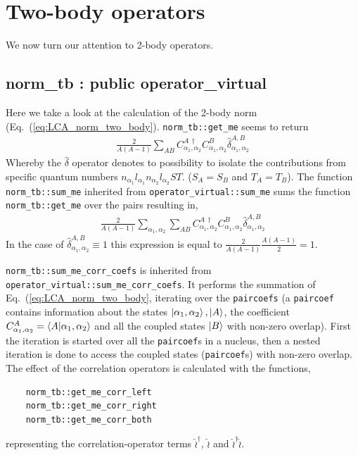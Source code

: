\documentclass[10pt]{article}
\begin{document}
\section{Two-body operators}
We now turn our attention to 2-body operators.
\subsection{norm\_tb : public operator\_virtual}
Here we take a look at the calculation of the 2-body norm (Eq.~(\ref{eq:LCA_norm_two_body}).
\texttt{norm\_tb::get\_me} seems to return 
\begin{align*}
	\frac{2}{A(A-1)}\sum_{AB} C_{\alpha_1,\alpha_2}^{A\,\dagger} C_{\alpha_1,\alpha_2}^{B} \hat{\delta}_{\alpha_1,\alpha_2}^{A,B}
\end{align*}
Whereby the $\hat{\delta}$ operator denotes to possibility to isolate the contributions from specific quantum numbers $n_{\alpha_1} l_{\alpha_1} n_{\alpha_2} l_{\alpha_2} S T$. ($S_{A} = S_{B}$ and $T_{A} = T_{B}$).
The function \texttt{norm\_tb::sum\_me} inherited from \texttt{operator\_virtual::sum\_me} sums the function \texttt{norm\_tb::get\_me} over the pairs resulting in,
\begin{align*}
	\frac{2}{A(A-1)} \sum_{\alpha_1,\alpha_2} \sum_{AB} C_{\alpha_1,\alpha_2}^{A\,\dagger} C_{\alpha_1,\alpha_2}^{B} \hat{\delta}_{\alpha_1,\alpha_2}^{A,B}
\end{align*}
In the case of $\hat{\delta}_{\alpha_1,\alpha_2}^{A,B} \equiv 1$ this expression is equal to $ \frac{2}{A(A-1)} \frac{A(A-1)}{2} = 1$.

\texttt{norm\_tb::sum\_me\_corr\_coefs} is inherited from \texttt{operator\_virtual::sum\_me\_corr\_coefs}.
It performs the summation of Eq.~(\ref{eq:LCA_norm_two_body}, iterating over the \texttt{paircoefs} (a \texttt{paircoef} contains information about the states $\ket{\alpha_1,\alpha_2},\ket{A}$, the coefficient $ C_{\alpha_1,\alpha_2}^{A}= \braket{A | \alpha_1,\alpha_2}$ and all the coupled states $\ket{B}$ with non-zero overlap).
First the iteration is started over all the \texttt{paircoef}s in a nucleus, then a nested iteration is done to access the coupled states (\texttt{paircoef}s) with non-zero overlap.
The effect of the correlation operators is calculated with the functions,
\begin{verbatim}
    norm_tb::get_me_corr_left
    norm_tb::get_me_corr_right
    norm_tb::get_me_corr_both
\end{verbatim}
representing the correlation-operator terms $\hat{\wr}^{\dagger}$, $\hat{\wr}$ and $\hat{\wr}^{\dagger} \hat{\wr}$.
\end{document}
